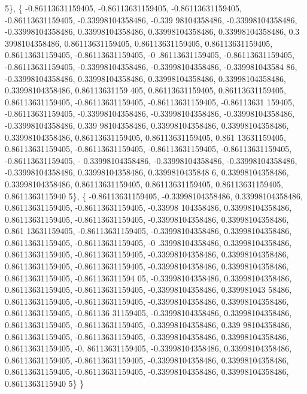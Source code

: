 \begin{DoxyCode}
      5\},
    \{ -0.86113631159405, -0.86113631159405, -0.86113631159405, -0.86113631159405, -0.33998104358486, -0.339
      98104358486, -0.33998104358486, -0.33998104358486, 0.33998104358486, 0.33998104358486, 0.33998104358486, 0.3
      3998104358486, 0.86113631159405, 0.86113631159405, 0.86113631159405, 0.86113631159405, -0.86113631159405, -0
      .86113631159405, -0.86113631159405, -0.86113631159405, -0.33998104358486, -0.33998104358486, -0.339981043584
      86, -0.33998104358486, 0.33998104358486, 0.33998104358486, 0.33998104358486, 0.33998104358486, 0.86113631159
      405, 0.86113631159405, 0.86113631159405, 0.86113631159405, -0.86113631159405, -0.86113631159405, -0.86113631
      159405, -0.86113631159405, -0.33998104358486, -0.33998104358486, -0.33998104358486, -0.33998104358486, 0.339
      98104358486, 0.33998104358486, 0.33998104358486, 0.33998104358486, 0.86113631159405, 0.86113631159405, 0.861
      13631159405, 0.86113631159405, -0.86113631159405, -0.86113631159405, -0.86113631159405, -0.86113631159405, -
      0.33998104358486, -0.33998104358486, -0.33998104358486, -0.33998104358486, 0.33998104358486, 0.3399810435848
      6, 0.33998104358486, 0.33998104358486, 0.86113631159405, 0.86113631159405, 0.86113631159405, 0.8611363115940
      5\},
    \{ -0.86113631159405, -0.33998104358486, 0.33998104358486, 0.86113631159405, -0.86113631159405, -0.33998
      104358486, 0.33998104358486, 0.86113631159405, -0.86113631159405, -0.33998104358486, 0.33998104358486, 0.861
      13631159405, -0.86113631159405, -0.33998104358486, 0.33998104358486, 0.86113631159405, -0.86113631159405, -0
      .33998104358486, 0.33998104358486, 0.86113631159405, -0.86113631159405, -0.33998104358486, 0.33998104358486,
       0.86113631159405, -0.86113631159405, -0.33998104358486, 0.33998104358486, 0.86113631159405, -0.861136311594
      05, -0.33998104358486, 0.33998104358486, 0.86113631159405, -0.86113631159405, -0.33998104358486, 0.339981043
      58486, 0.86113631159405, -0.86113631159405, -0.33998104358486, 0.33998104358486, 0.86113631159405, -0.861136
      31159405, -0.33998104358486, 0.33998104358486, 0.86113631159405, -0.86113631159405, -0.33998104358486, 0.339
      98104358486, 0.86113631159405, -0.86113631159405, -0.33998104358486, 0.33998104358486, 0.86113631159405, -0.
      86113631159405, -0.33998104358486, 0.33998104358486, 0.86113631159405, -0.86113631159405, -0.33998104358486,
       0.33998104358486, 0.86113631159405, -0.86113631159405, -0.33998104358486, 0.33998104358486, 0.8611363115940
      5\}
  \}
\end{DoxyCode}
\mbox{\label{classfemus_1_1hex__gauss_a831f1eea9fa85e31d69ca29de52f22c8}} 
